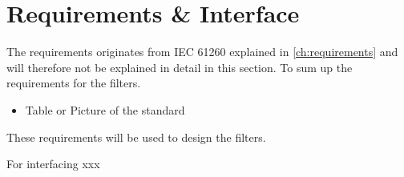 \section{Requirements \& Interface}
The requirements originates from IEC 61260 explained in \autoref{ch:requirements} and will therefore not be explained in detail in this section. To sum up the requirements for the filters. 

\begin{itemize}
\item Table or Picture of the standard
\end{itemize}
 
These requirements will be used to design the filters. 

For interfacing xxx   

